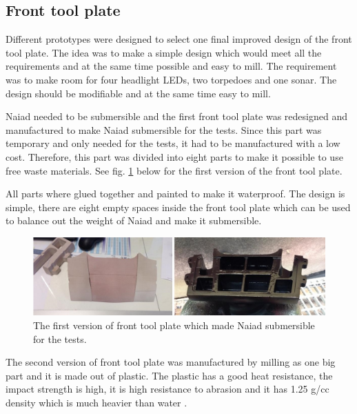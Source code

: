 \subsection{Front tool plate} %

Different prototypes were designed to select one final improved design of the front tool plate. The idea was to make a simple design which would meet all the requirements and at the same time possible and easy to mill. The requirement was to make room for four headlight LEDs, two torpedoes and one sonar. The design should be modifiable and at the same time easy to mill.

Naiad needed to be submersible and the first front tool plate was redesigned and manufactured to make Naiad submersible for the tests. Since this part was temporary and only needed for the tests, it had to be manufactured with a low cost. Therefore, this part was divided into eight parts to make it possible to use free waste materials. See fig. \ref{ToolPlate1} below for the first version of the front tool plate.

All parts where glued together and painted to make it waterproof. The design is simple, there are eight empty spaces inside the front tool plate which can be used to balance out the weight of Naiad and make it submersible.

	\begin{figure}[!ht]
	\begin{center}
		\includegraphics[width=150mm]{./Images/Mechanics/ftp1}
		\caption{The first version of front tool plate which made Naiad submersible for the tests.}
		\label{ToolPlate1}
	\end{center}
\end{figure}

The second version of front tool plate was manufactured by milling as one big part and it is made out of plastic. The plastic has a good heat resistance, the impact strength is high, it is high resistance to abrasion and it has 1.25 g/cc density which is much heavier than water \cite{ftpplastic}.


